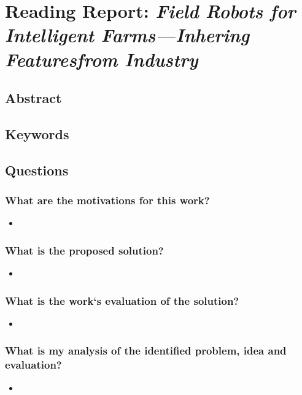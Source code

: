 \documentclass{article}
\begin{document}


\section{Reading Report: \emph{Field Robots for Intelligent Farms—Inhering Featuresfrom Industry}}
\cite{deSantos2020}

\subsection*{Abstract}

\subsection*{Keywords}

\subsection*{Questions}
\subsubsection*{What are the motivations for this work?}
\begin{itemize}
    \item 
\end{itemize}
\subsubsection*{What is the proposed solution?}
\begin{itemize}
    \item 
\end{itemize}
\subsubsection*{What is the work`s evaluation of the solution?}
\begin{itemize}
    \item 
\end{itemize}
\subsubsection*{What is my analysis of the identified problem, idea and evaluation?}
\begin{itemize}
    \item 
\end{itemize}
\end{document}
